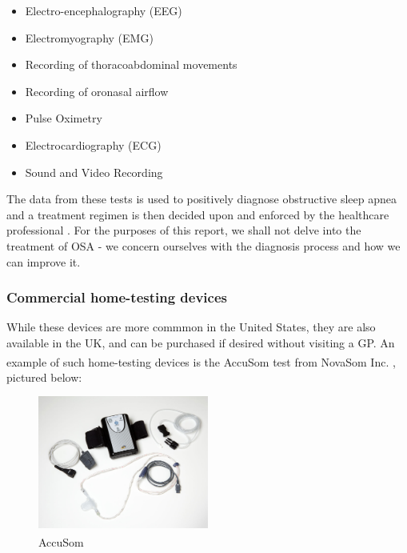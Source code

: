 	\begin{itemize}
	\item Electro-encephalography (EEG)
	\item Electromyography (EMG)
	\item Recording of thoracoabdominal movements
	\item Recording of oronasal airflow
	\item Pulse Oximetry
	\item Electrocardiography (ECG)
	\item Sound and Video Recording
	\end{itemize}

The data from these tests is used to positively diagnose obstructive sleep apnea and a treatment regimen is then decided upon and enforced by the healthcare professional \cite{nhsdiag}. For the purposes of this report, we shall not delve into the treatment of OSA - we concern ourselves with the diagnosis process and how we can improve it.


\subsubsection{Commercial home-testing devices}

While these devices are more commmon in the United States, they are also available in the UK, and can be purchased if desired without visiting a GP. An example of such home-testing devices is the AccuSom\textsuperscript{\textregistered{}} test from NovaSom Inc. \cite{novasom1,novasom2}, pictured below: 

\begin{figure}[!ht]
\centering
\includegraphics[width=0.5\textwidth]{drawings/Novasom}
\caption{AccuSom\textsuperscript{\textregistered{}} \cite{novasom2}}
\label{fig:Novacom}
\end{figure}

